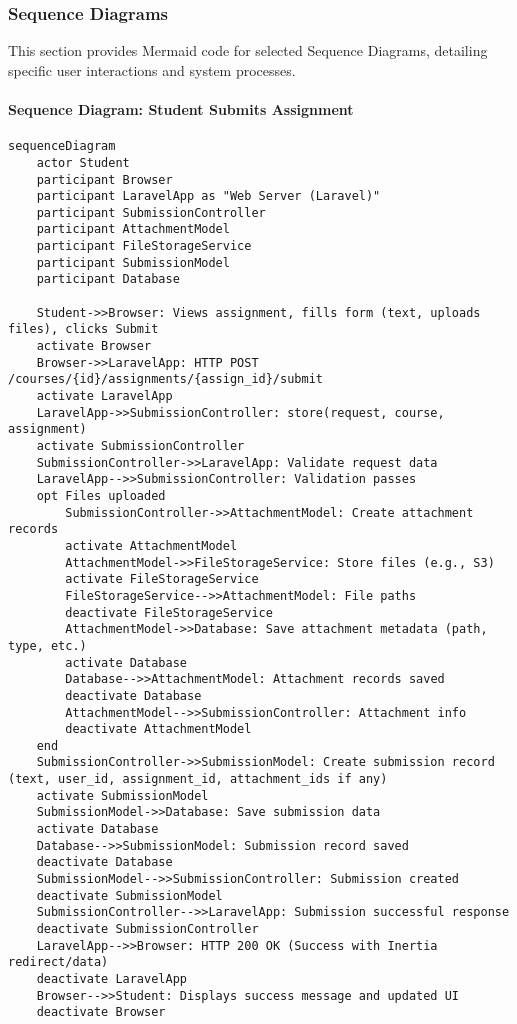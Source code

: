 \subsubsection*{Sequence Diagrams}

This section provides Mermaid code for selected Sequence Diagrams, detailing specific user interactions and system processes.

\paragraph*{Sequence Diagram: Student Submits Assignment}
\begin{verbatim}
sequenceDiagram
    actor Student
    participant Browser
    participant LaravelApp as "Web Server (Laravel)"
    participant SubmissionController
    participant AttachmentModel
    participant FileStorageService
    participant SubmissionModel
    participant Database

    Student->>Browser: Views assignment, fills form (text, uploads files), clicks Submit
    activate Browser
    Browser->>LaravelApp: HTTP POST /courses/{id}/assignments/{assign_id}/submit
    activate LaravelApp
    LaravelApp->>SubmissionController: store(request, course, assignment)
    activate SubmissionController
    SubmissionController->>LaravelApp: Validate request data
    LaravelApp-->>SubmissionController: Validation passes
    opt Files uploaded
        SubmissionController->>AttachmentModel: Create attachment records
        activate AttachmentModel
        AttachmentModel->>FileStorageService: Store files (e.g., S3)
        activate FileStorageService
        FileStorageService-->>AttachmentModel: File paths
        deactivate FileStorageService
        AttachmentModel->>Database: Save attachment metadata (path, type, etc.)
        activate Database
        Database-->>AttachmentModel: Attachment records saved
        deactivate Database
        AttachmentModel-->>SubmissionController: Attachment info
        deactivate AttachmentModel
    end
    SubmissionController->>SubmissionModel: Create submission record (text, user_id, assignment_id, attachment_ids if any)
    activate SubmissionModel
    SubmissionModel->>Database: Save submission data
    activate Database
    Database-->>SubmissionModel: Submission record saved
    deactivate Database
    SubmissionModel-->>SubmissionController: Submission created
    deactivate SubmissionModel
    SubmissionController-->>LaravelApp: Submission successful response
    deactivate SubmissionController
    LaravelApp-->>Browser: HTTP 200 OK (Success with Inertia redirect/data)
    deactivate LaravelApp
    Browser-->>Student: Displays success message and updated UI
    deactivate Browser
\end{verbatim}


